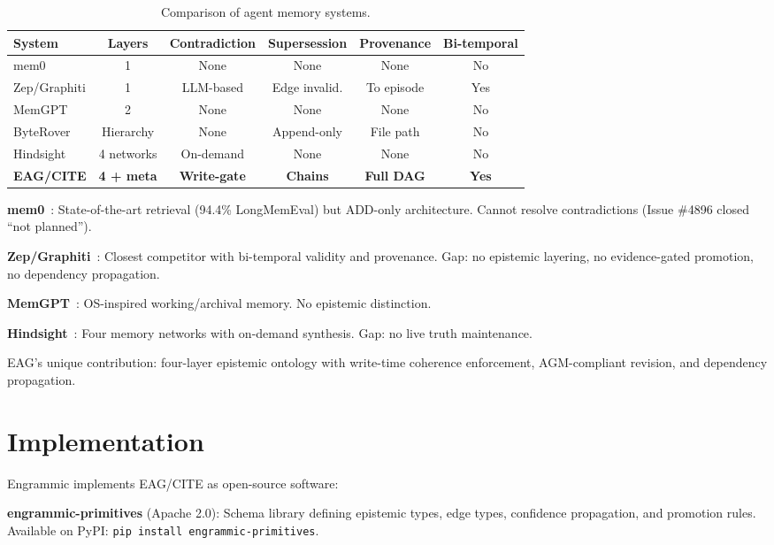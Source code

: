 \documentclass[11pt,a4paper]{article}
\begin{document}
\begin{table}[H]
\centering
\caption{Comparison of agent memory systems.}
\label{tab:comparison}
\begin{tabular}{@{}lccccc@{}}
\toprule
\textbf{System} & \textbf{Layers} & \textbf{Contradiction} & \textbf{Supersession} & \textbf{Provenance} & \textbf{Bi-temporal} \\
\midrule
mem0 & 1 & None & None & None & No \\
Zep/Graphiti & 1 & LLM-based & Edge invalid. & To episode & Yes \\
MemGPT & 2 & None & None & None & No \\
ByteRover & Hierarchy & None & Append-only & File path & No \\
Hindsight & 4 networks & On-demand & None & None & No \\
\textbf{EAG/CITE} & \textbf{4 + meta} & \textbf{Write-gate} & \textbf{Chains} & \textbf{Full DAG} & \textbf{Yes} \\
\bottomrule
\end{tabular}
\end{table}

\textbf{mem0}~\cite{mem0}: State-of-the-art retrieval (94.4\% LongMemEval) but ADD-only architecture. Cannot resolve contradictions (Issue \#4896 closed ``not planned'').

\textbf{Zep/Graphiti}~\cite{graphiti2025}: Closest competitor with bi-temporal validity and provenance. Gap: no epistemic layering, no evidence-gated promotion, no dependency propagation.

\textbf{MemGPT}~\cite{memgpt2023}: OS-inspired working/archival memory. No epistemic distinction.

\textbf{Hindsight}~\cite{hindsight}: Four memory networks with on-demand synthesis. Gap: no live truth maintenance.

EAG's unique contribution: four-layer epistemic ontology with write-time coherence enforcement, AGM-compliant revision, and dependency propagation.

\section{Implementation}

Engrammic implements EAG/CITE as open-source software:

\textbf{engrammic-primitives} (Apache 2.0): Schema library defining epistemic types, edge types, confidence propagation, and promotion rules. Available on PyPI: \texttt{pip install engrammic-primitives}.
\end{document}
